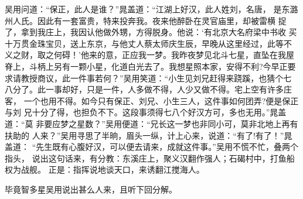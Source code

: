吴用问道：“保正，此人是谁？”晁盖道：“江湖上好汉，此人姓刘，名唐，
是东潞州人氏。因此有一套富贵，特来投奔我。夜来他醉卧在灵官庙里，却被雷横
捉了，拿到我庄上，我因认他做外甥，方得脱身。他说：‘有北京大名府梁中书收
买十万贯金珠宝贝，送上东京，与他丈人蔡太师庆生辰，早晚从这里经过，此等不
义之财，取之何碍！’他来的意，正应我一梦。我昨夜梦见北斗七星，直坠在我屋
脊上，斗柄上另有一颗小星，化道白光去了。我想星照本家，安得不利?今早正要
求请教授商议，此一件事若何？”吴用笑道：“小生见刘兄赶得来跷蹊，也猜个七
八分了。此一事却好，只是一件，人多做不得，人少又做不得。宅上空有许多庄客，
一个也用不得。如今只有保正、刘兄、小生三人，这件事如何团弄?便是保正与刘
兄十分了得，也担负不下。这段事须得七八个好汉方可，多也无用。”晁盖道：“莫
非要应梦之星数？”吴用便道：“兄长这一梦也非同小可，莫非北地上再有扶助的
人来？”吴用寻思了半晌，眉头一纵，计上心来，说道：“有了!有了！”晁盖道：
“先生既有心腹好汉，可以便去请来，成就这件事。”吴用不慌不忙，叠两个指头，
说出这句话来，有分教：东溪庄上，聚义汉翻作强人；石碣村中，打鱼船权为战舰。
正是：指挥说地谈天口，来诱翻江搅海人。

毕竟智多星吴用说出甚么人来，且听下回分解。